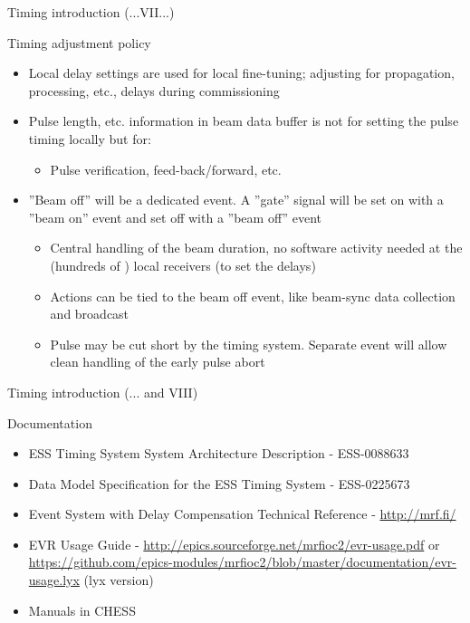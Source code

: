 \documentclass[
  9pt
  , table
  , ignorenonframetext
]{beamer}
\begin{document}
\begin{frame}{Timing introduction (...VII...)}
  \begin{block}{Timing adjustment policy}
    \begin{itemize}
      \item Local delay settings are used for local fine-tuning; adjusting for propagation, processing, etc., delays during commissioning
      \item Pulse length, etc. information in beam data buffer is not for setting the pulse timing locally but for:
      \begin{itemize}
        \item Pulse verification, feed-back/forward, etc.
      \end{itemize}
      \item ”Beam off” will be a dedicated event. A ”gate” signal will be set on with a ”beam on” event and set off with a ”beam off” event
      \begin{itemize}
        \item Central handling of the beam duration, no software activity needed at the (hundreds of ) local receivers (to set the delays)
        \item Actions can be tied to the beam off event, like beam-sync data collection and broadcast
        \item Pulse may be cut short by the timing system. Separate event will allow clean handling of the early pulse abort
      \end{itemize}
    \end{itemize}
  \end{block}
\end{frame}

\begin{frame}{Timing introduction (... and VIII)}
  \begin{block}{Documentation}
    \begin{itemize}
      \item ESS Timing System System Architecture Description - ESS-0088633
      \item Data Model Specification for the ESS Timing System - ESS-0225673
      \item Event System with Delay Compensation Technical Reference - \url{http://mrf.fi/}
      \item EVR Usage Guide - \url{http://epics.sourceforge.net/mrfioc2/evr-usage.pdf} or \url{https://github.com/epics-modules/mrfioc2/blob/master/documentation/evr-usage.lyx} (lyx version)
      \item Manuals in CHESS
    \end{itemize}
  \end{block}
\end{frame}
\end{document}
